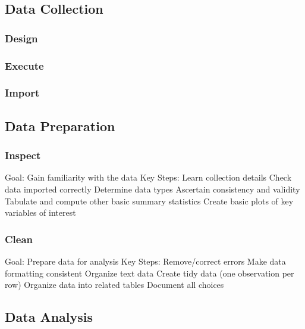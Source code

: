 \documentclass[
]{book}
\begin{document}
\hypertarget{data-collection2}{%
\subsection{Data Collection}\label{data-collection2}}

\hypertarget{design}{%
\subsubsection{Design}\label{design}}

\hypertarget{execute}{%
\subsubsection{Execute}\label{execute}}

\hypertarget{import}{%
\subsubsection{Import}\label{import}}

\hypertarget{data-preparation}{%
\subsection{Data Preparation}\label{data-preparation}}

\hypertarget{inspect}{%
\subsubsection{Inspect}\label{inspect}}

Goal:
Gain familiarity with the data
Key Steps:
Learn collection details
Check data imported correctly
Determine data types
Ascertain consistency and validity
Tabulate and compute other basic summary statistics
Create basic plots of key variables of interest

\hypertarget{clean}{%
\subsubsection{Clean}\label{clean}}

Goal:
Prepare data for analysis
Key Steps:
Remove/correct errors
Make data formatting consistent
Organize text data
Create tidy data (one observation per row)
Organize data into related tables
Document all choices

\hypertarget{data-analysis2}{%
\subsection{Data Analysis}\label{data-analysis2}}
\end{document}
